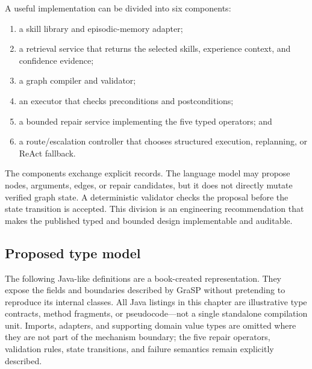 A useful implementation can be divided into six components:

\begin{enumerate}
  \item a skill library and episodic-memory adapter;
  \item a retrieval service that returns the selected skills, experience context, and confidence evidence;
  \item a graph compiler and validator;
  \item an executor that checks preconditions and postconditions;
  \item a bounded repair service implementing the five typed operators; and
  \item a route/escalation controller that chooses structured execution, replanning, or ReAct fallback.
\end{enumerate}

The components exchange explicit records. The language model may propose nodes, arguments, edges, or repair candidates, but it does not directly mutate verified graph state. A deterministic validator checks the proposal before the state transition is accepted. This division is an engineering recommendation that makes the published typed and bounded design implementable and auditable.

\subsection{Proposed type model}

The following Java-like definitions are a book-created representation. They expose the fields and boundaries described by GraSP without pretending to reproduce its internal classes. All Java listings in this chapter are illustrative type contracts, method fragments, or pseudocode—not a single standalone compilation unit. Imports, adapters, and supporting domain value types are omitted where they are not part of the mechanism boundary; the five repair operators, validation rules, state transitions, and failure semantics remain explicitly described.

